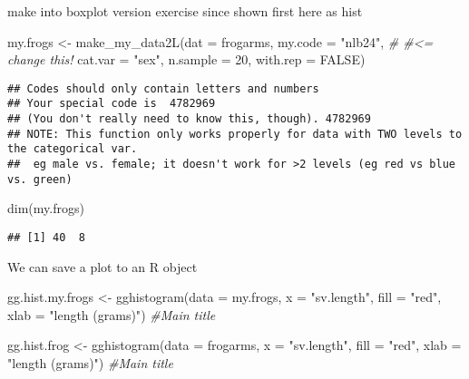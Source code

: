 \documentclass[
]{book}
\newenvironment{Shaded}{\begin{snugshade}}{\end{snugshade}}
\newcommand{\AttributeTok}[1]{\textcolor[rgb]{0.77,0.63,0.00}{#1}}
\newcommand{\CommentTok}[1]{\textcolor[rgb]{0.56,0.35,0.01}{\textit{#1}}}
\newcommand{\ConstantTok}[1]{\textcolor[rgb]{0.00,0.00,0.00}{#1}}
\newcommand{\DecValTok}[1]{\textcolor[rgb]{0.00,0.00,0.81}{#1}}
\newcommand{\FunctionTok}[1]{\textcolor[rgb]{0.00,0.00,0.00}{#1}}
\newcommand{\NormalTok}[1]{#1}
\newcommand{\OtherTok}[1]{\textcolor[rgb]{0.56,0.35,0.01}{#1}}
\newcommand{\StringTok}[1]{\textcolor[rgb]{0.31,0.60,0.02}{#1}}
\begin{document}
make into boxplot version exercise since shown first here as hist

\begin{Shaded}
\begin{Highlighting}[]
\NormalTok{my.frogs }\OtherTok{\textless{}{-}} \FunctionTok{make\_my\_data2L}\NormalTok{(}\AttributeTok{dat =}\NormalTok{ frogarms, }
                           \AttributeTok{my.code =} \StringTok{"nlb24"}\NormalTok{, }\CommentTok{\# \#\textless{}=  change this!}
                           \AttributeTok{cat.var =} \StringTok{"sex"}\NormalTok{,}
                           \AttributeTok{n.sample =} \DecValTok{20}\NormalTok{, }
                           \AttributeTok{with.rep =} \ConstantTok{FALSE}\NormalTok{)}
\end{Highlighting}
\end{Shaded}

\begin{verbatim}
## Codes should only contain letters and numbers
## Your special code is  4782969
## (You don't really need to know this, though). 4782969
## NOTE: This function only works properly for data with TWO levels to the categorical var.
##  eg male vs. female; it doesn't work for >2 levels (eg red vs blue vs. green)
\end{verbatim}

\begin{Shaded}
\begin{Highlighting}[]
\FunctionTok{dim}\NormalTok{(my.frogs)}
\end{Highlighting}
\end{Shaded}

\begin{verbatim}
## [1] 40  8
\end{verbatim}

We can save a plot to an R object

\begin{Shaded}
\begin{Highlighting}[]
\NormalTok{gg.hist.my.frogs }\OtherTok{\textless{}{-}} \FunctionTok{gghistogram}\NormalTok{(}\AttributeTok{data =}\NormalTok{ my.frogs,}
            \AttributeTok{x =} \StringTok{"sv.length"}\NormalTok{,}
            \AttributeTok{fill =} \StringTok{"red"}\NormalTok{,}
            \AttributeTok{xlab =} \StringTok{"length (grams)"}\NormalTok{) }\CommentTok{\#Main title}


\NormalTok{gg.hist.frog }\OtherTok{\textless{}{-}} \FunctionTok{gghistogram}\NormalTok{(}\AttributeTok{data =}\NormalTok{ frogarms,}
            \AttributeTok{x =} \StringTok{"sv.length"}\NormalTok{,}
            \AttributeTok{fill =} \StringTok{"red"}\NormalTok{,}
            \AttributeTok{xlab =} \StringTok{"length (grams)"}\NormalTok{) }\CommentTok{\#Main title}
\end{Highlighting}
\end{Shaded}
\end{document}
